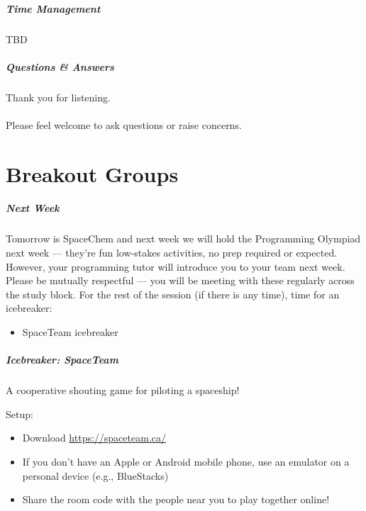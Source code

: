 \begin{frame}
	\frametitle{Time Management}
	
	TBD
	
\end{frame}

\begin{frame}
	\frametitle{Questions \& Answers}	
	\begin{center}
		Thank you for listening. 
		\\~\\
		Please feel welcome to ask questions or raise concerns.
	\end{center}
\end{frame}

\part{Breakout Groups}
\frame{\partpage}

\begin{frame}
	\frametitle{Next Week}
	
	Tomorrow is SpaceChem and next week we will hold the Programming Olympiad next week --- they're fun low-stakes activities, no prep required or expected. However, your programming tutor will introduce you to your team next week. Please be mutually respectful  --- you will be meeting with these regularly across the study block. For the rest of the session (if there is any time), time for an icebreaker:
	
	\begin{itemize}
		\item SpaceTeam icebreaker
	\end{itemize}
\end{frame}

\begin{frame}
	\frametitle{Icebreaker: SpaceTeam}
	
	A cooperative shouting game for piloting a spaceship!
	
	Setup:
	
	\begin{itemize}
		\item Download \url{https://spaceteam.ca/}
		\item If you don't have an Apple or Android mobile phone, use an emulator on a personal device (e.g., BlueStacks)
		\item Share the room code with the people near you to play together online!
	\end{itemize}
	
\end{frame}

